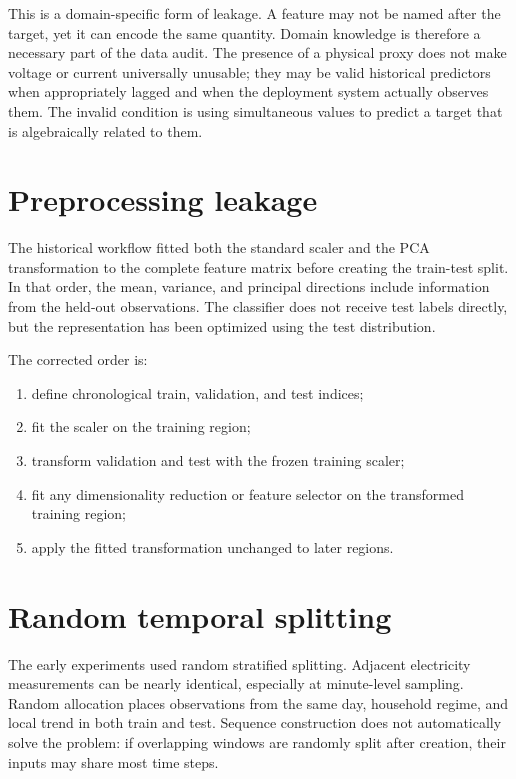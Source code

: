 This is a domain-specific form of leakage. A feature may not be named after the target, yet it can encode the same quantity. Domain knowledge is therefore a necessary part of the data audit. The presence of a physical proxy does not make voltage or current universally unusable; they may be valid historical predictors when appropriately lagged and when the deployment system actually observes them. The invalid condition is using simultaneous values to predict a target that is algebraically related to them.

\section{Preprocessing leakage}

The historical workflow fitted both the standard scaler and the PCA transformation to the complete feature matrix before creating the train-test split. In that order, the mean, variance, and principal directions include information from the held-out observations. The classifier does not receive test labels directly, but the representation has been optimized using the test distribution.

The corrected order is:
\begin{enumerate}
  \item define chronological train, validation, and test indices;
  \item fit the scaler on the training region;
  \item transform validation and test with the frozen training scaler;
  \item fit any dimensionality reduction or feature selector on the transformed training region;
  \item apply the fitted transformation unchanged to later regions.
\end{enumerate}

\section{Random temporal splitting}

The early experiments used random stratified splitting. Adjacent electricity measurements can be nearly identical, especially at minute-level sampling. Random allocation places observations from the same day, household regime, and local trend in both train and test. Sequence construction does not automatically solve the problem: if overlapping windows are randomly split after creation, their inputs may share most time steps.

